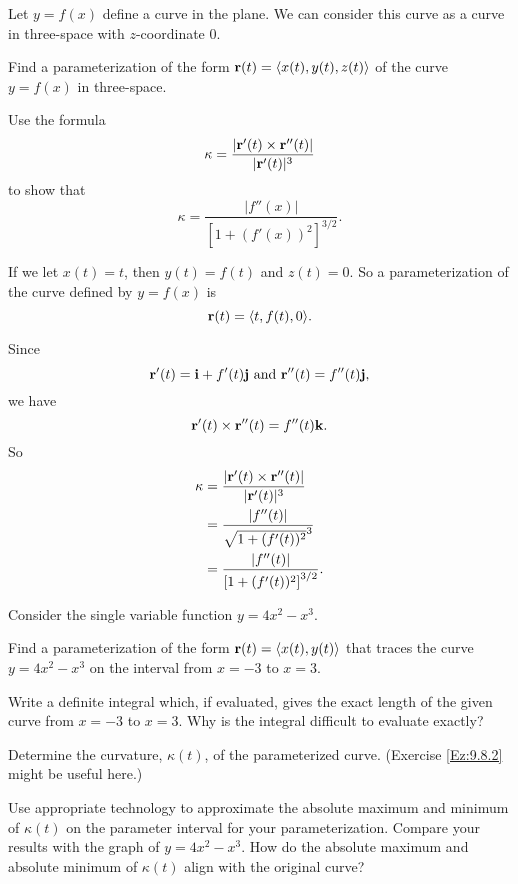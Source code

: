 \begin{exercises}
\item \label{Ez:9.8.2} Let $y = f(x)$ define a curve in the plane. We can consider this curve as a curve in three-space with $z$-coordinate 0. 
	\ba
	\item Find a parameterization of the form $\mathbf{r}(t) = \langle x(t), y(t), z(t) \rangle$ of the curve $y=f(x)$ in three-space. 
	\item Use the formula 
\[\kappa = \frac{\lvert \mathbf{r}'(t) \times \mathbf{r}''(t) \rvert}{\lvert \mathbf{r}'(t) \rvert^3}\]
to show that 
\[\kappa = \frac{\lvert f''(x) \rvert}{\left[1+(f'(x))^2\right]^{3/2}}.\]
	\ea

\begin{exerciseSolution}
    \ba
	    \item If we let $x(t) = t$, then $y(t) = f(t)$ and $z(t)=0$. So a parameterization of the curve defined by $y=f(x)$ is 
\[\mathbf{r}(t) = \langle t, f(t), 0 \rangle.\]
	    \item Since 
	    \[\mathbf{r}'(t) = \mathbf{i} + f'(t) \mathbf{j} \text{ and } \mathbf{r}''(t) = f''(t) \mathbf{j},\]
	    we have 
	    \[\mathbf{r}'(t) \times \mathbf{r}''(t) = f''(t) \mathbf{k}.\]
	    So 
\begin{align*}
\kappa &= \frac{\lvert \mathbf{r}'(t) \times \mathbf{r}''(t) \rvert}{\lvert \mathbf{r}'(t) \rvert^3} \\
	&= \frac{\lvert f''(t) \rvert}{\sqrt{1+(f'(t))^2}^3} \\
	&= \frac{\lvert f''(t) \rvert}{\left[1+(f'(t))^2\right]^{3/2}}.
\end{align*}
    \ea
\end{exerciseSolution}	

	
\item \label{Ez:9.8.3}    Consider the single variable function $y = 4x^2 - x^3.$ 
    \ba
	    \item Find a parameterization of the form $\mathbf{r}(t) = \langle x(t), y(t) \rangle$ that traces the curve $y = 4x^2 - x^3$ on the interval from $x =  -3$ to $x = 3$.
	    \item Write a definite integral which, if evaluated, gives the exact length of the given curve from $x =  -3$ to $x = 3$.  Why is the integral difficult to evaluate exactly?
	    \item Determine the curvature, $\kappa(t)$, of the parameterized curve. (Exercise \ref{Ez:9.8.2} might be useful here.)
	    \item Use appropriate technology to approximate the absolute maximum and minimum of $\kappa(t)$ on the parameter interval for your parameterization.  Compare your results with the graph of $y = 4x^2 - x^3$.  How do the absolute maximum and absolute minimum of $\kappa(t)$ align with the original curve?
    \ea



\end{exercises}
